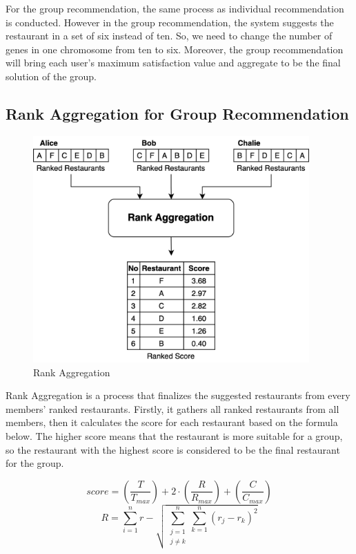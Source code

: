 \documentclass[12pt,oneside,openright,a4paper]{cpe-english-project}
\begin{document}
For the group recommendation, the same process as individual recommendation is conducted. However in the group recommendation, the system suggests the restaurant in a set of six instead of ten. So, we need to change the number of genes in one chromosome from ten to six. Moreover, the group recommendation will bring each user’s maximum satisfaction value and aggregate to be the final solution of the group.

\subsection{Rank Aggregation for Group Recommendation}


\begin{figure}[H]\centering
\includegraphics[width=300pt]{./images/3ga_rankagg.png}
\caption{Rank Aggregation}\label{fig:3ga_rankagg}
\end{figure}\vspace{-24pt}

Rank Aggregation is a process that finalizes the suggested restaurants from every members’ ranked restaurants. Firstly, it gathers all ranked restaurants from all members, then it calculates the score for each restaurant based on the formula below. The higher score means that the restaurant is more suitable for a group, so the restaurant with the highest score is considered to be the final restaurant for the group.

\begin{equation}\label{eq:rankaggscore}
score = \left (\frac{T}{T_{max}}  \right ) + 2\cdot \left (\frac{R}{R_{max}}  \right ) + \left (\frac{C}{C_{max}}  \right )
\end{equation}
\begin{equation}\label{eq:rankaggscorerank}
R = \sum_{i=1}^{n}r - \sqrt{\sum_{\substack{j=1 \\ j\neq k}}^{n}\sum_{k=1}^{n}(r_j - r_k)^2}
\end{equation}
\end{document}

